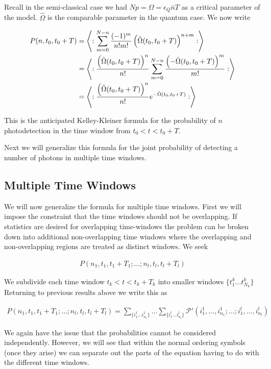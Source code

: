 \documentclass[12pt]{article}
\begin{document}
Recall in the semi-classical case we had $N p = \Omega = \epsilon_Q \bar{n} T$ as a critical parameter of the model. $\hat{\Omega}$ is the comparable parameter in the quantum case. We now write

\begin{align}
P(n,t_0,t_0+T) &= \Braket{:\sum_{m=0}^{N-n} \frac{(-1)^m}{n! m!}\left(\hat{\Omega}(t_0,t_0+T)\right)^{n+m}:}\\
&=\Braket{:\frac{\left(\hat{\Omega}(t_0,t_0+T)\right)^n}{n!}\sum_{m=0}^{N-n} \frac{\left(-\hat{\Omega}(t_0,t_0+T)\right)^m}{m!} :}\\
&= \Braket{:\frac{\left(\hat{\Omega}(t_0,t_0+T)\right)^n}{n!}e^{-\hat{\Omega}(t_0,t_0+T)} :}
\end{align}

This is the anticipated Kelley-Kleiner formula for the probability of $n$ photodetection in the time window from $t_0<t<t_0+T$. 

Next we will generalize this formula for the joint probability of detecting a number of photons in multiple time windows.

\subsection{Multiple Time Windows}

We will now generalize the formula for multiple time windows. First we will impose the constraint that the time windows should not be overlapping. If statistics are desired for overlapping time-windows the problem can be broken down into additional non-overlapping time windows where the overlapping and non-overlapping regions are treated as distinct windows. We seek

\begin{align}
P\left(n_1,t_1,t_1+T_1;\ldots ;n_l,t_l,t_l+T_l\right)
\end{align}

We subdivide each time window $t_k<t<t_k+T_k$ into smaller windows $\{t^k_1 \ldots t^k_{N_k} \}$
Returning to previous results above we write this as

\begin{align}
P(n_1,t_1,t_1+T_1;\ldots ;n_l,t_l,t_l+T_l) = \sum_{\{i^1_1 \ldots i^1_{n_1}\}} \ldots \sum_{\{i^l_1 \ldots i^l_{n_l}\}} \mathcal{P}'\left(i^1_1, \ldots ,i^1_{n_1}; \ldots ;i^l_1, \ldots ,i^l_{n_l}\right)
\end{align}

We again have the issue that the probabilities cannot be considered independently. However, we will see that within the normal ordering symbols (once they arise) we can separate out the parts of the equation having to do with the different time windows. 
\end{document}
